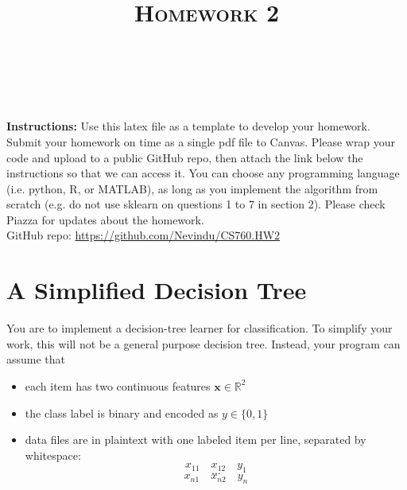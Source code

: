 \documentclass[a4paper]{article}
\title{\textsc{Homework 2}} %
\author{
\red{$>>$Nevindu M. Batagoda$<<$} \\
\red{$>>$9081677594$<<$}\\
}
\date{}
\theoremstyle{definition}
\newcommand{\RR}{\mathbb{R}}
\def\x{\mathbf x}
\begin{document}
\maketitle 


\textbf{Instructions:} 
Use this latex file as a template to develop your homework. Submit your homework on time as a single pdf file to Canvas. Please wrap your code and upload to a public GitHub repo, then attach the link below the instructions so that we can access it. You can choose any programming language (i.e. python, R, or MATLAB), as long as you implement the algorithm from scratch (e.g. do not use sklearn on questions 1 to 7 in section 2). Please check Piazza for updates about the homework. \\

GitHub repo: \url{https://github.com/Nevindu/CS760.HW2}

\section{A Simplified Decision Tree}
You are to implement a decision-tree learner for classification.
To simplify your work, this will not be a general purpose decision tree.  Instead, your program can assume that
\begin{itemize}
\item each item has two continuous features $\x \in \RR^2$
\item the class label is binary and encoded as $y \in \{0,1\}$
\item data files are in plaintext with one labeled item per line, separated by whitespace:
$$x_{11} \quad x_{12} \quad y_1$$
$$...$$
$$x_{n1} \quad x_{n2} \quad y_n$$
\end{itemize}
\end{document}
